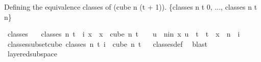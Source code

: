 \begin{isabellebody}
%
\isadelimdocument
%
\endisadelimdocument
%
\begin{isamarkuptext}%
Defining the equivalence classes of (cube n (t + 1)). \{classes n t 0, ..., classes n t n\}%
\end{isamarkuptext}\isamarkuptrue%
\isamarkupfalse%
\ classes\isanewline
\ \ \ {\isachardoublequoteopen}classes\ n\ t\ {\isasymequiv}\ {\isacharparenleft}{\kern0pt}{\isasymlambda}i{\isachardot}{\kern0pt}\ {\isacharbraceleft}{\kern0pt}x\ {\isachardot}{\kern0pt}\ x\ {\isasymin}\ {\isacharparenleft}{\kern0pt}cube\ n\ {\isacharparenleft}{\kern0pt}t\ {\isacharplus}{\kern0pt}\ {}{\isacharparenright}{\kern0pt}{\isacharparenright}{\kern0pt}\ {\isasymand}\ {\isacharparenleft}{\kern0pt}{\isasymforall}u\ {\isasymin}\ {\isacharbraceleft}{\kern0pt}{\isacharparenleft}{\kern0pt}n{\isacharminus}{\kern0pt}i{\isacharparenright}{\kern0pt}{\isachardot}{\kern0pt}{\isachardot}{\kern0pt}{\isacharless}{\kern0pt}n{\isacharbraceright}{\kern0pt}{\isachardot}{\kern0pt}\ x\ u\ {\isacharequal}{\kern0pt}\ t{\isacharparenright}{\kern0pt}\ {\isasymand}\ t\ {\isasymnotin}\ x\ {\isacharbackquote}{\kern0pt}\ {\isacharbraceleft}{\kern0pt}{\isachardot}{\kern0pt}{\isachardot}{\kern0pt}{\isacharless}{\kern0pt}{\isacharparenleft}{\kern0pt}n\ {\isacharminus}{\kern0pt}\ i{\isacharparenright}{\kern0pt}{\isacharbraceright}{\kern0pt}{\isacharbraceright}{\kern0pt}{\isacharparenright}{\kern0pt}{\isachardoublequoteclose}\isanewline
\isanewline
{}\isamarkupfalse%
\ classes{\isacharunderscore}{\kern0pt}subset{\isacharunderscore}{\kern0pt}cube{\isacharcolon}{\kern0pt}\ {\isachardoublequoteopen}classes\ n\ t\ i\ {\isasymsubseteq}\ cube\ n\ {\isacharparenleft}{\kern0pt}t{\isacharplus}{\kern0pt}{}{\isacharparenright}{\kern0pt}{\isachardoublequoteclose}%
\isadelimproof
\ %
\endisadelimproof
%
\isatagproof
{}\isamarkupfalse%
\ classes{\isacharunderscore}{\kern0pt}def\ \isamarkupfalse%
\ blast%
\endisatagproof
{\isafoldproof}%
%
\isadelimproof
%
\endisadelimproof
\isanewline
\isanewline
{}\isamarkupfalse%
\ layered{\isacharunderscore}{\kern0pt}subspace\isanewline

\end{isabellebody}
